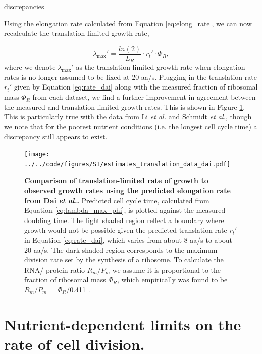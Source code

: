 discrepancies \documentclass[11pt, letterpaper]{article}
\begin{document}

Using the elongation rate calculated from Equation \ref{eq:elong_rate}, we can now
recalculate the translation-limited growth rate,

\begin{equation}
\lambda_{\text{max}}' =  \frac{ln(2)} {L_R} \cdot r_t' \cdot \Phi_R,
\label{eq:lambda_max_phi_dai}
\end{equation}
where we denote $\lambda_{\text{max}}'$ as the translation-limited growth rate when elongation rates is no longer assumed
to be fixed at 20 aa/s. Plugging in the translation rate $r_t'$ given by Equation \ref{eq:rate_dai}
along with the measured fraction of ribosomal mass $\Phi_R$ from each dataset, we find a
further improvement in agreement between the measured and translation-limited growth rates.
This is shown in Figure \ref{fig:estimates_translation_data_dai}. This is particularly true with
the data from Li {\it et al.} and Schmidt {\it et al.}, though we note that
for the poorest nutrient conditions (i.e. the longest cell cycle time) a
discrepancy still appears to exist.

\begin{figure}[H]
		\centering
    \texttt{[image: ../../code/figures/SI/estimates\_translation\_data\_dai.pdf]}
  \caption{{\bf Comparison of translation-limited rate of growth to observed growth rates using the predicted
	elongation rate from Dai {\it et al.}.}
	Predicted cell cycle time, calculated from  Equation \ref{eq:lambda_max_phi}, is plotted
	against the measured doubling time.	The light shaded region reflect a boundary where growth would not be possible
	given the predicted translation rate $r_t'$ in Equation \ref{eq:rate_dai}, which varies from about 8 aa/s to about 20 aa/s.
	The dark shaded region corresponds to the maximum
	division rate set by the synthesis of a ribosome. To calculate the RNA/ protein ratio
	$R_m/P_m$ we assume it is proportional to the fraction of ribosomal mass $\Phi_R$,  which
	empirically was found to be $R_m/P_m$ = $\Phi_R$/0.411 \cite{Dai2016}.}
  \label{fig:estimates_translation_data_dai}
\end{figure}



\newpage
\section{Nutrient-dependent limits on the rate of cell division.}
\end{document}
